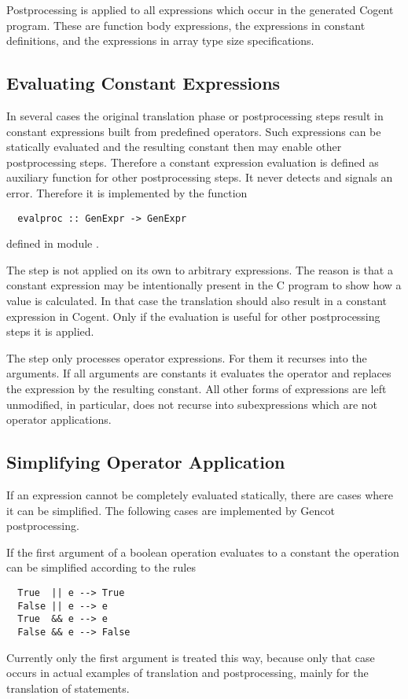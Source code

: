 Postprocessing is applied to all expressions which occur in the generated Cogent program. These are function 
body expressions, the expressions in constant definitions, and the expressions in array type size specifications.

\subsection{Evaluating Constant Expressions}
\label{impl-post-const}

In several cases the original translation phase or postprocessing steps result in constant expressions built
from predefined operators. Such expressions can be statically evaluated and the resulting constant then may
enable other postprocessing steps. Therefore a constant expression evaluation is defined as auxiliary 
function for other postprocessing steps. It never detects and signals an error. Therefore it is implemented
by the function
\begin{verbatim}
  evalproc :: GenExpr -> GenExpr
\end{verbatim}
defined in module .

The  step is not applied on its own to arbitrary expressions. The reason is that a constant
expression may be intentionally present in the C program to show how a value is calculated. In that case the 
translation should also result in a constant expression in Cogent. Only if the evaluation is useful for other 
postprocessing steps it is applied.

The  step only processes operator expressions. For them it recurses into the arguments. If all arguments
are constants it evaluates the operator and replaces the expression by the resulting constant. All other forms
of expressions are left unmodified, in particular,  does not recurse into subexpressions which are
not operator applications.

\subsection{Simplifying Operator Application}
\label{impl-post-op}

If an expression cannot be completely evaluated statically, there are cases where it can be simplified.
The following cases are implemented by Gencot postprocessing.

If the first argument of a boolean operation evaluates to a constant the operation can be simplified according 
to the rules
\begin{verbatim}
  True  || e --> True
  False || e --> e
  True  && e --> e
  False && e --> False
\end{verbatim}
Currently only the first argument is treated this way, because only that case occurs in actual examples of translation
and postprocessing, mainly for the translation of  statements.

